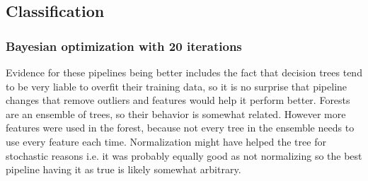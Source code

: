 \documentclass[12pt, letterpaper]{article}
\begin{document}

\subsection{Classification}

\subsubsection{Bayesian optimization with 20 iterations}

Evidence for these pipelines being better includes the fact that decision trees tend to be very liable to overfit their training data, so it is no surprise that pipeline changes that remove outliers and features would help it perform better. Forests are an ensemble of trees, so their behavior is somewhat related. However more features were used in the forest, because not every tree in the ensemble needs to use every feature each time. Normalization might have helped the tree for stochastic reasons i.e. it was probably equally good as not normalizing so the best pipeline having it as true is likely somewhat arbitrary.
\end{document}
